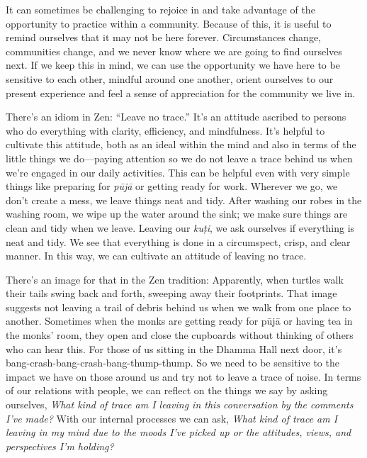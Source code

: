 It can sometimes be challenging to rejoice in and take advantage of the 
opportunity to practice within a community. Because of this, it is 
useful to remind ourselves that it may not be here forever. 
Circumstances change, communities change, and we never know where we 
are going to find ourselves next. If we keep this in mind, we can use 
the opportunity we have here to be sensitive to each other, mindful 
around one another, orient ourselves to our present experience and feel 
a sense of appreciation for the community we live in.


There's an idiom in Zen: ``Leave no trace.'' It's an attitude ascribed 
to persons who do everything with clarity, efficiency, and mindfulness. 
It's helpful to cultivate this attitude, both as an ideal within the 
mind and also in terms of the little things we do---paying attention so 
we do not leave a trace behind us when we're engaged in our daily 
activities. This can be helpful even with very simple things like 
preparing for \emph{pūjā} or getting ready for work. Wherever we go, 
we don't create a mess, we leave things neat and tidy. After washing 
our robes in the washing room, we wipe up the water around the sink; we 
make sure things are clean and tidy when we leave. Leaving our 
\emph{kuṭi}, we ask ourselves if everything is neat and tidy. We see 
that everything is done in a circumspect, crisp, and clear manner. In 
this way, we can cultivate an attitude of leaving no trace.

There's an image for that in the Zen tradition: Apparently, when 
turtles walk their tails swing back and forth, sweeping away their 
footprints. That image suggests not leaving a trail of debris behind us 
when we walk from one place to another. Sometimes when the monks are 
getting ready for pūjā or having tea in the monks' room, they open 
and close the cupboards without thinking of others who can hear this. 
For those of us sitting in the Dhamma Hall next door, it's 
bang-crash-bang-crash-bang-thump-thump. So we need to be sensitive to 
the impact we have on those around us and try not to leave a trace of 
noise. In terms of our relations with people, we can reflect on the 
things we say by asking ourselves, \emph{What kind of trace am I 
leaving in this conversation by the comments I've made?} With our 
internal processes we can ask, \emph{What kind of trace am I leaving in 
my mind due to the moods I've picked up or the attitudes, views, and 
perspectives I'm holding?}

